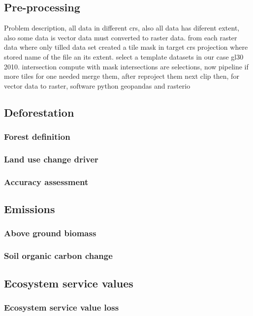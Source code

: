 	\subsection{Pre-processing}
		Problem description, all data in different crs, also all data has diferent extent, also some data is vector data must converted to raster data. from each raster data where only tilled data set created a tile mask in target crs projection where stored name of the file an its extent. select a template datasets in our case gl30 2010. intersection compute with mask intersections are selections, now pipeline if more tiles for one needed merge them, after reproject them next clip then, for vector data to raster, software python geopandas and rasterio

	\subsection{Deforestation}
		\subsubsection{Forest definition}
			\lipsum[1-2]
		\subsubsection{Land use change driver}
			\lipsum[1-2]
		\subsubsection{Accuracy assessment}
			\lipsum[1-2]

	\subsection{Emissions}
		\subsubsection{Above ground biomass}
			\lipsum[1-2]
		\subsubsection{Soil organic carbon change}
			\lipsum[1-2]

	\subsection{Ecosystem service values}
		\subsubsection{Ecosystem service value loss}
			\lipsum[1-2]
